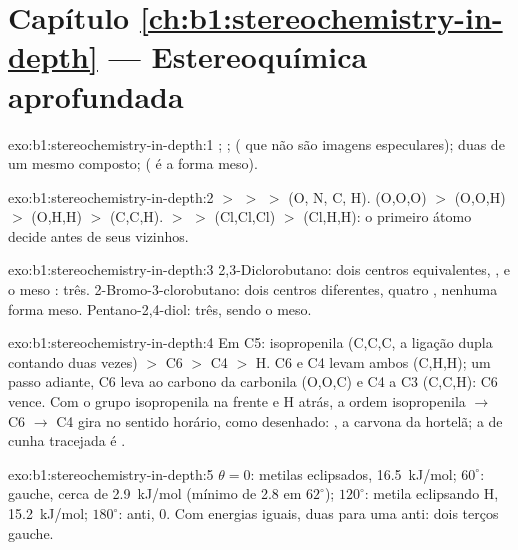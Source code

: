\section*{Capítulo \ref{ch:b1:stereochemistry-in-depth} --- Estereoquímica aprofundada}

\begin{solution}{exo:b1:stereochemistry-in-depth:1}
; ; 
( que não são imagens especulares); duas  de
um mesmo composto;  ( é a forma meso).
\end{solution}

\begin{solution}{exo:b1:stereochemistry-in-depth:2}
 $>$  $>$  $>$  (O, N, C, H).
 (O,O,O) $>$  (O,O,H) $>$  (O,H,H) $>$
 (C,C,H).  $>$  $>$  (Cl,Cl,Cl)
$>$  (Cl,H,H): o primeiro átomo decide antes de seus vizinhos.
\end{solution}

\begin{solution}{exo:b1:stereochemistry-in-depth:3}
2,3-Diclorobutano: dois centros equivalentes, ,  e o
meso : três. 2-Bromo-3-clorobutano: dois centros diferentes,
quatro , nenhuma forma meso. Pentano-2,4-diol: três, sendo
 o meso.
\end{solution}

\begin{solution}{exo:b1:stereochemistry-in-depth:4}
Em C5: isopropenila (C,C,C, a ligação dupla contando duas vezes) $>$ C6
$>$ C4 $>$ H. C6 e C4 levam ambos (C,H,H); um passo adiante, C6 leva ao
carbono da carbonila (O,O,C) e C4 a C3 (C,C,H): C6 vence. Com o grupo
isopropenila na frente e H atrás, a ordem isopropenila $\to$ C6 $\to$ C4
gira no sentido horário, como desenhado: , a carvona da hortelã; a
de cunha tracejada é
.
\end{solution}

\begin{solution}{exo:b1:stereochemistry-in-depth:5}
$\theta = 0$: metilas eclipsados, \qty{16.5}{kJ/mol}; $60^\circ$: gauche,
cerca de \qty{2.9}{kJ/mol} (mínimo de 2.8 em $62^\circ$); $120^\circ$:
metila eclipsando H, \qty{15.2}{kJ/mol}; $180^\circ$: anti, 0. Com
energias iguais, duas  para uma anti: dois terços
gauche.
\end{solution}

